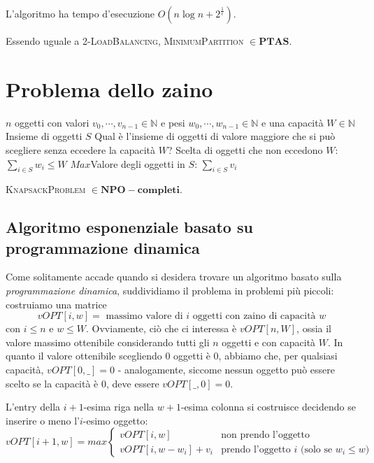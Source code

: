 \begin{theorem}
	L'algoritmo ha tempo d'esecuzione $O(n\log{n} + 2^{\frac{1}{\epsilon}})$.
\end{theorem}
\begin{corollario}
	Essendo uguale a \textsc{2-LoadBalancing},  \textsc{MinimumPartition} $\in \mathbf{PTAS}$.
\end{corollario}

\section{Problema dello zaino}
 {$n$ oggetti con valori $v_0, \cdots, v_{n-1} \in \mathbb{N}$ e
	pesi $w_0, \cdots, w_{n-1} \in \mathbb{N}$ e una capacità $W \in \mathbb{N}$} {Insieme di oggetti $S$}
{Qual è l'insieme di oggetti di valore maggiore che si può scegliere senza eccedere
	la capacità $W$?}
{Scelta di oggetti che non eccedono $W$: $\sum_{i \in S} w_i \leq W$}
{$Max$}{Valore degli oggetti in $S$: $\sum_{i \in S} v_i$}

\begin{theorem}
	\textsc{KnapsackProblem} $\in \mathbf{NPO-completi}$.
\end{theorem}

\subsection{Algoritmo esponenziale basato su programmazione dinamica}
Come solitamente accade quando si desidera trovare un algoritmo basato
sulla \textit{programmazione dinamica}, suddividiamo il problema in problemi
più piccoli: costruiamo una matrice
$$
	vOPT[i, w] =  \text{ massimo valore di } i \text{ oggetti con zaino di capacità } w
$$
con $ i \leq n$ e $w \leq W$. Ovviamente, ciò che ci interessa è $vOPT[n, W]$,
ossia il valore massimo ottenibile considerando tutti gli $n$ oggetti
e con capacità $W$.
In quanto il valore ottenibile scegliendo $0$ oggetti è $0$, abbiamo che, per qualsiasi
capacità, $vOPT[0, \_] = 0$ - analogamente, siccome nessun oggetto può essere scelto
se la capacità è $0$, deve essere $vOPT[\_, 0]  = 0$.

L'entry della $i+1$-esima riga nella $w+1$-esima colonna
si costruisce decidendo se inserire o meno l'$i$-esimo oggetto:
$$
	vOPT[i+1, w] = max
	\begin{cases}
		vOPT[i, w]             & \text{non prendo l'oggetto} \\
		vOPT[i, w - w_i] + v_i & \text{prendo l'oggetto } i \text{ (solo se } w_i \leq w \text{)}
	\end{cases}
$$

